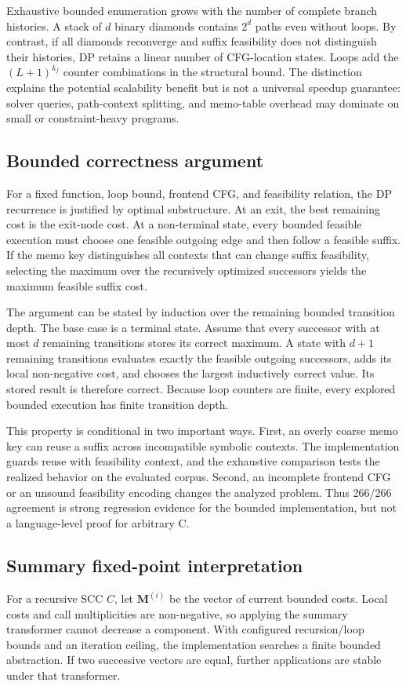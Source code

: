\documentclass[10pt,conference]{IEEEtran}
\begin{document}
Exhaustive bounded enumeration grows with the number of complete branch histories. A stack of $d$ binary diamonds contains $2^d$ paths even without loops. By contrast, if all diamonds reconverge and suffix feasibility does not distinguish their histories, DP retains a linear number of CFG-location states. Loops add the $(L+1)^{k_f}$ counter combinations in the structural bound. The distinction explains the potential scalability benefit but is not a universal speedup guarantee: solver queries, path-context splitting, and memo-table overhead may dominate on small or constraint-heavy programs.

\subsection{Bounded correctness argument}
For a fixed function, loop bound, frontend CFG, and feasibility relation, the DP recurrence is justified by optimal substructure. At an exit, the best remaining cost is the exit-node cost. At a non-terminal state, every bounded feasible execution must choose one feasible outgoing edge and then follow a feasible suffix. If the memo key distinguishes all contexts that can change suffix feasibility, selecting the maximum over the recursively optimized successors yields the maximum feasible suffix cost.

The argument can be stated by induction over the remaining bounded transition depth. The base case is a terminal state. Assume that every successor with at most $d$ remaining transitions stores its correct maximum. A state with $d+1$ remaining transitions evaluates exactly the feasible outgoing successors, adds its local non-negative cost, and chooses the largest inductively correct value. Its stored result is therefore correct. Because loop counters are finite, every explored bounded execution has finite transition depth.

This property is conditional in two important ways. First, an overly coarse memo key can reuse a suffix across incompatible symbolic contexts. The implementation guards reuse with feasibility context, and the exhaustive comparison tests the realized behavior on the evaluated corpus. Second, an incomplete frontend CFG or an unsound feasibility encoding changes the analyzed problem. Thus 266/266 agreement is strong regression evidence for the bounded implementation, but not a language-level proof for arbitrary C.

\subsection{Summary fixed-point interpretation}
For a recursive SCC $C$, let $\mathbf{M}^{(i)}$ be the vector of current bounded costs. Local costs and call multiplicities are non-negative, so applying the summary transformer cannot decrease a component. With configured recursion/loop bounds and an iteration ceiling, the implementation searches a finite bounded abstraction. If two successive vectors are equal, further applications are stable under that transformer.
\end{document}
